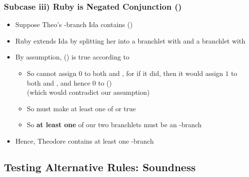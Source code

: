 \begin{frame}
\frametitle{Subcase iii) Ruby is Negated Conjunction (\enot \eand)}

\begin{itemize}[<+->]

\item Suppose Theo's -branch Ida contains \enot(\metaA{}\eand\metaB{})

\item Ruby extends Ida by splitting her into a branchlet with \enot \metaA{} and a branchlet with \enot \metaB{}

\item By assumption, \enot(\metaA{}\eand\metaB{}) is true according to 

\medskip

\begin{itemize}

\item So  cannot assign $0$ to both \enot \metaA{} and \enot \metaB{}, for if it did, then it would assign $1$ to both \metaA{} and \metaB{}, and hence $0$ to \enot(\metaA{}\eand\metaB{}) \\ (which would contradict our assumption)

\item So  must make at least one of \enot \metaA{} or \enot \metaB{} true

\item So \textbf{\textcolor{OGlyallpink}{at least one}} of our two branchlets must be an -branch



\end{itemize}

\bigskip


\item Hence, Theodore contains at least one -branch



\end{itemize}
\end{frame}


\subsection{Testing Alternative Rules: Soundness}

